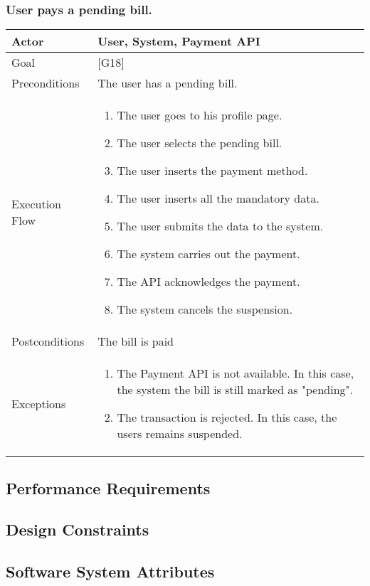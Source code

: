 \documentclass[english]{article}
\begin{document}
			\subsubsection{User pays a pending bill.}
			\begin{tabularx}{\textwidth}{  l  X  }
				\hline
				Actor & User, System, Payment API\\
				\hline
				Goal & [G18]\\
				\hline
				Preconditions & The user has a pending bill.\\
				\hline
				Execution Flow & \begin{enumerate}
					\item{The user goes to his profile page.}
					\item{The user selects the pending bill.}
					\item{The user inserts the payment method.}
					\item{The user inserts all the mandatory data.}
					\item{The user submits the data to the system.}
					\item{The system carries out the payment.}
					\item{The API acknowledges the payment.}
					\item{The system cancels the suspension.}
				\end{enumerate}\\
				\hline
				Postconditions & The bill is paid\\
				\hline
				Exceptions & \begin{enumerate}
					\item{The Payment API is not available. In this case, the system the bill is still marked as "pending".}
					\item{The transaction is rejected. In this case, the users remains suspended.}
				\end{enumerate}\\
				\hline
			\end{tabularx}

\subsection{Performance Requirements}

\subsection{Design Constraints}

\subsection{Software System Attributes}
\end{document}
